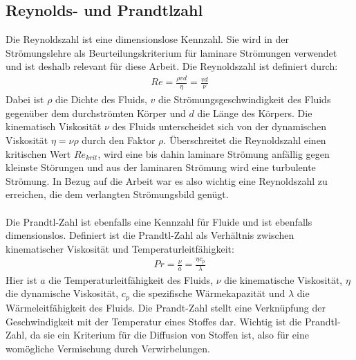 \subsection{Reynolds- und Prandtlzahl}
Die Reynoldszahl ist eine dimensionslose Kennzahl. Sie wird in der Str\"{o}mungslehre als Beurteilungskriterium f\"{u}r laminare Str\"{o}mungen verwendet und ist deshalb relevant f\"{u}r diese Arbeit. Die Reynoldszahl ist definiert durch:
\begin{align*}
{Re} = \frac{\rho vd}{\eta} = \frac{vd}{\nu}
\end{align*}
Dabei ist \(\rho\) die Dichte des Fluids, \(v\) die Str\"{o}mungsgeschwindigkeit des Fluids gegen\"{u}ber dem durchstr\"{o}mten K\"{o}rper und \(d\) die L\"{a}nge des K\"{o}rpers. Die kinematisch Viskosit\"{a}t \(\nu\) des Fluids unterscheidet sich von der dynamischen Viskosit\"{a}t \(\eta = \nu \rho\) durch den Faktor \(\rho\). \"{U}berschreitet die Reynoldszahl einen kritischen Wert \({Re}_{krit}\), wird eine bis dahin laminare Str\"{o}mung anf\"{a}llig gegen kleinste St\"{o}rungen und aus der laminaren Str\"{o}mung wird eine turbulente Str\"{o}mung. In Bezug auf die Arbeit war es also wichtig eine Reynoldszahl zu erreichen, die dem verlangten Str\"{o}mungsbild gen\"{u}gt\cite{reynolds}.
\\\\
Die Prandtl-Zahl ist ebenfalls eine Kennzahl f\"{u}r Fluide und ist ebenfalls dimensionslos. Definiert ist die Prandtl-Zahl als Verh\"{a}ltnis zwischen kinematischer Viskosit\"{a}t und Temperaturleitf\"{a}higkeit:
\begin{align*}
{Pr} = \frac{\nu}{a} = \frac{\eta c_p}{\lambda}
\end{align*}
Hier ist \(a\) die Temperaturleitf\"{a}higkeit des Fluids, \(\nu\) die kinematische Viskosit\"{a}t, \(\eta\) die dynamische Viskosit\"{a}t, \(c_p\) die spezifische W\"{a}rmekapazit\"{a}t und \(\lambda\) die W\"{a}rmeleitf\"{a}higkeit des Fluids. Die Prandt-Zahl stellt eine Verkn\"{u}pfung der Geschwindigkeit mit der Temperatur eines Stoffes dar. Wichtig ist die Prandtl-Zahl, da sie ein Kriterium f\"{u}r die Diffusion von Stoffen ist, also f\"{u}r eine wom\"{o}gliche Vermischung durch Verwirbelungen\cite{prandtl}.